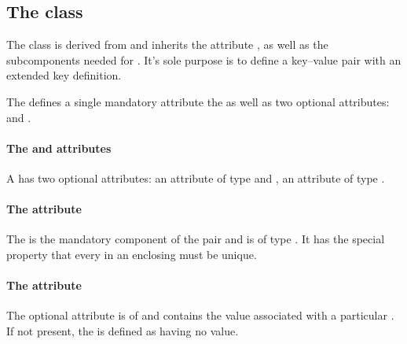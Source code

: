 \subsection{The \FBC {} class}
\label{keyvaluepair-class}

The \FBC \KeyValuePair class is derived from \SBase and inherits the attribute ,   as well as the subcomponents needed for \Notes. It's sole purpose is to define a key--value pair with an extended key definition.

The \KeyValuePair defines a single mandatory attribute the  as well as two optional attributes:  and .

\paragraph{The  and  attributes}
A \KeyValuePair has two optional attributes:  an attribute of
type  and , an attribute of type .

\paragraph{The  attribute}
The  is the mandatory component of the \KeyValuePair pair and is of type . It has the special property that every  in an enclosing \ListOfKeyValuePairs must be unique.

\paragraph{The  attribute}
The optional  attribute is of  and contains the value associated with a particular . If not present, the \KeyValuePair is defined as having no value.

